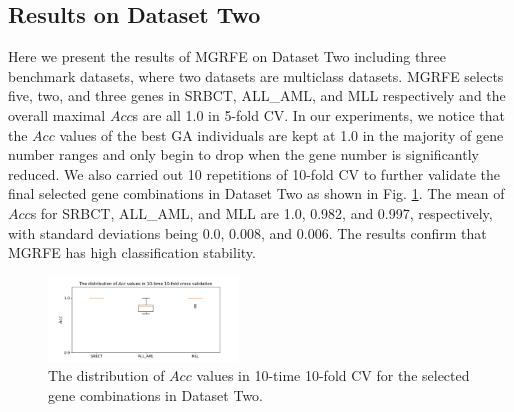 \documentclass[10pt,journal,compsoc]{IEEEtran}
\begin{document}
	\subsection{Results on Dataset Two}
	
	Here we present the results of MGRFE on Dataset Two including three benchmark datasets, where two datasets are multiclass datasets. MGRFE selects five, two, and three genes in SRBCT, ALL\_AML, and MLL respectively and the overall maximal \(Acc\)s are all 1.0 in 5-fold CV. In our experiments, we notice that the \(Acc\) values of the best GA individuals are kept at 1.0 in the majority of gene number ranges and only begin to drop when the gene number is significantly reduced. We also carried out 10 repetitions of 10-fold CV to further validate the final selected gene combinations in Dataset Two as shown in Fig. \ref{Fig:CV2}. The mean of \(Acc\)s for SRBCT, ALL\_AML, and MLL are 1.0, 0.982, and 0.997, respectively, with standard deviations being 0.0, 0.008, and 0.006. The results confirm that MGRFE has high classification stability.
	
	
	\begin{figure}[htbp]
		\centering
		\includegraphics[width=0.45\textwidth]{pictures/CV2.pdf}
		\caption{The distribution of $Acc$ values in 10-time 10-fold CV for the selected gene combinations in Dataset Two.}
		\label{Fig:CV2}
	\end{figure}
	
\end{document}
